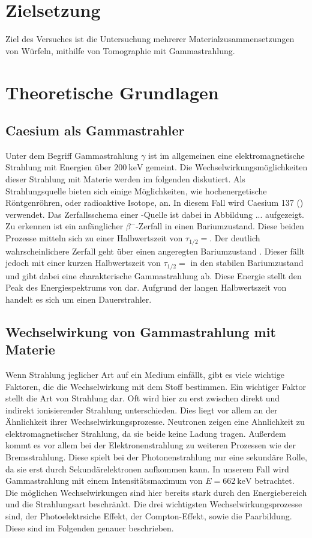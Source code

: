 \section{Zielsetzung}
Ziel des Versuches ist die Untersuchung mehrerer Materialzusammensetzungen von Würfeln, mithilfe von Tomographie mit Gammastrahlung.

\section{Theoretische Grundlagen}

\subsection{Caesium als Gammastrahler}
Unter dem Begriff Gammastrahlung $\gamma$ ist im allgemeinen eine elektromagnetische Strahlung mit Energien über $\SI{200}{\kilo\electronvolt}$ gemeint. 
Die Wechselwirkungsmöglichkeiten dieser Strahlung mit Materie werden im folgenden diskutiert. Als Strahlungsquelle bieten sich einige Möglichkeiten, wie hochenergetische Röntgenröhren, oder radioaktive Isotope, an. 
In diesem Fall wird Caesium 137 () verwendet. Das Zerfallsschema einer -Quelle ist dabei in Abbildung ... aufgezeigt. Zu erkennen ist ein anfänglicher $\beta^{-}$-Zerfall in einen Bariumzustand. 
Diese beiden Prozesse mitteln sich zu einer Halbwertszeit von $\tau_{1\text{/}2} = $. Der deutlich wahrscheinlichere Zerfall geht über einen angeregten Bariumzustand . 
Dieser fällt jedoch mit einer kurzen Halbwertszeit von $\tau_{1\text{/}2} = $ in den stabilen Bariumzustand und gibt dabei eine charakterische Gammastrahlung ab. 
Diese Energie stellt den Peak des Energiespektrums von  dar. Aufgrund der langen Halbwertszeit von  handelt es sich um einen Dauerstrahler.
\subsection{Wechselwirkung von Gammastrahlung mit Materie}
Wenn Strahlung jeglicher Art auf ein Medium einfällt, gibt es viele wichtige Faktoren, die die Wechselwirkung mit dem Stoff bestimmen. 
Ein wichtiger Faktor stellt die Art von Strahlung dar. Oft wird hier zu erst zwischen direkt und indirekt ionisierender Strahlung unterschieden. 
Dies liegt vor allem an der Ähnlichkeit ihrer Wechselwirkungsprozesse. Neutronen zeigen eine Ahnlichkeit zu elektromagnetischer Strahlung, da sie beide keine Ladung tragen. 
Außerdem kommt es vor allem bei der Elektronenstrahlung zu weiteren Prozessen wie der Bremsstrahlung. Diese spielt bei der Photonenstrahlung nur eine sekundäre Rolle, da sie erst durch Sekundärelektronen aufkommen kann. 
In unserem Fall wird Gammastrahlung mit einem Intensitätsmaximum von $E = \SI{662}{\kilo\electronvolt}$ betrachtet. 
Die möglichen Wechselwirkungen sind hier bereits stark durch den Energiebereich und die Strahlungsart beschränkt.
Die drei wichtigsten Wechselwirkungsprozesse sind, der Photoelektrsiche Effekt, der Compton-Effekt, sowie die Paarbildung. Diese sind im Folgenden genauer beschrieben.
